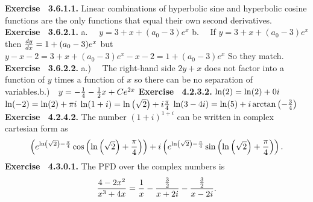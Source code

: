  {\noindent \protect \bf  Exercise ~3.6.1.1.} Linear combinations of hyperbolic sine and hyperbolic cosine functions are the only functions that equal their own second derivatives.  \protect \newline  \protect \newline  
 {\noindent \protect \bf  Exercise ~3.6.2.1.} a.~~ $y=3 +x + (a_0-3)e^x$ b.~~ If $y =3 +x + (a_0-3)e^x$ then $\protect \frac  {dy}{dx} = 1 +(a_0-3)e^x$ but $y-x-2 = 3+x+(a_0-3)e^x -x-2 = 1 + (a_0-3)e^x$ So they match.  \protect \newline  \protect \newline  
 {\noindent \protect \bf  Exercise ~3.6.2.2.} a.)~~ The right-hand side $2y+x$ does not factor into a function of $y$ times a function of $x$ so there can be no separation of variables.\protect \newline  b.)~~$y = -\protect \frac  {1}{4} -\protect \frac  {1}{2}x +Ce^{2x}$ \protect \newline   \protect \newline  \protect \newline  
 {\noindent \protect \bf  Exercise ~4.2.3.2.} \textbullet $\protect \qopname  \relax o{ln}(2)=\protect \qopname  \relax o{ln}(2)+0i$ \textbullet $\protect \qopname  \relax o{ln}(-2)=\protect \qopname  \relax o{ln}(2)+\pi i$ \textbullet $\protect \qopname  \relax o{ln}(1+i)=\protect \qopname  \relax o{ln}\left (\protect \sqrt  {2}\right )+i\protect \frac  {\pi }{4}$ \textbullet $\protect \qopname  \relax o{ln}(3-4i)=\protect \qopname  \relax o{ln}(5)+i\protect \qopname  \relax o{arctan}\left (-\protect \frac  {3}{4}\right )$ \protect \newline  \protect \newline  
 {\noindent \protect \bf  Exercise ~4.2.4.2.} The number $(1+i)^{1+i}$ can be written in complex cartesian form as $$\left (e^{\protect \qopname  \relax o{ln}\left (\protect \sqrt  {2}\right )-\protect \frac  {\pi }{4}}\protect \qopname  \relax o{cos}\left (\protect \qopname  \relax o{ln}\left (\protect \sqrt  {2}\right )+\protect \frac  {\pi }{4} \right )\right )+i\left (e^{\protect \qopname  \relax o{ln}\left (\protect \sqrt  {2}\right )-\protect \frac  {\pi }{4}}\protect \qopname  \relax o{sin}\left (\protect \qopname  \relax o{ln}\left (\protect \sqrt  {2}\right )+\protect \frac  {\pi }{4} \right )\right ). $$ \protect \newline  \protect \newline  
 {\noindent \protect \bf  Exercise ~4.3.0.1.} The PFD over the complex numbers is $$\protect \frac  {4-2x^2}{x^3+4x}=\protect \frac  {1}{x}-\protect \frac  {\protect \frac  {3}{2}}{x+2i}-\protect \frac  {\protect \frac  {3}{2}}{x-2i}. $$ \protect \newline  \protect \newline  
